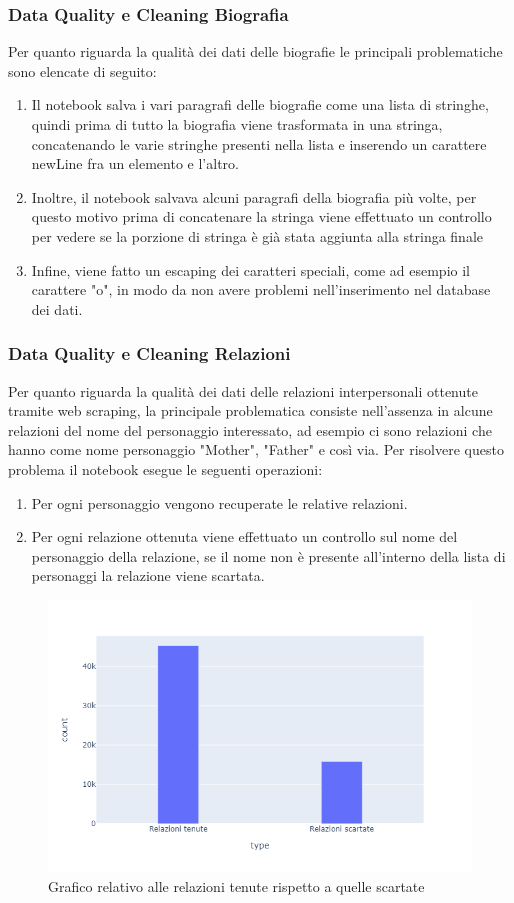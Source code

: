\documentclass[
12pt, %
a4paper, %
oneside, %
headinclude,footinclude, %
BCOR5mm, %
]{scrartcl}
\begin{document}
\subsubsection{Data Quality e Cleaning Biografia}
Per quanto riguarda la qualità dei dati delle biografie le principali problematiche sono elencate di seguito:
\begin{enumerate}
	\item Il notebook salva i vari paragrafi delle biografie come una lista di stringhe, quindi prima di tutto la biografia viene trasformata in una stringa, concatenando le varie stringhe presenti nella lista e inserendo un carattere newLine fra un elemento e l'altro.
	\item Inoltre, il notebook  salvava alcuni paragrafi della biografia più volte, per questo motivo prima di concatenare la stringa viene effettuato un controllo per vedere se la porzione di stringa è già stata aggiunta alla stringa finale
	\item Infine, viene fatto un escaping dei caratteri speciali, come ad esempio il carattere "o", in modo da non avere problemi nell'inserimento nel database dei dati.
\end{enumerate}
\subsubsection{Data Quality e Cleaning Relazioni}
Per quanto riguarda la qualità dei dati delle relazioni interpersonali ottenute tramite web scraping, la principale problematica consiste nell'assenza in alcune relazioni del nome del personaggio interessato, ad esempio ci sono relazioni che hanno come nome personaggio "Mother", "Father" e così via.
Per risolvere questo problema il notebook esegue le seguenti operazioni:
\begin{enumerate}
	\item Per ogni personaggio vengono recuperate le relative relazioni.
	\item Per ogni relazione ottenuta viene effettuato un controllo sul nome del personaggio della relazione, se il nome non è presente all'interno della lista di personaggi la relazione viene scartata.
\end{enumerate}
\begin{figure}[H]
  \includegraphics[scale=0.5]{plot_relazioni.png}
  \caption{Grafico relativo alle relazioni tenute rispetto a quelle scartate}
\end{figure}
\end{document}
